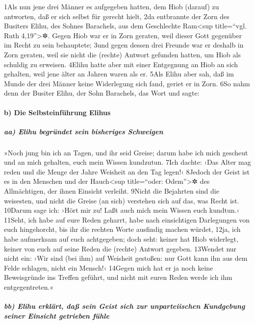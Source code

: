 1Als nun jene drei Männer es aufgegeben hatten, dem Hiob (darauf) zu
antworten, daß er sich selbst für gerecht hielt, 2da entbrannte der Zorn
des Busiters Elihu, des Sohnes Barachels, aus dem Geschlechte
Ram\textless sup title=``vgl. Ruth 4,19''\textgreater✲. Gegen Hiob war
er in Zorn geraten, weil dieser Gott gegenüber im Recht zu sein
behauptete; 3und gegen dessen drei Freunde war er deshalb in Zorn
geraten, weil sie nicht die (rechte) Antwort gefunden hatten, um Hiob
als schuldig zu erweisen. 4Elihu hatte aber mit einer Entgegnung an Hiob
an sich gehalten, weil jene älter an Jahren waren als er. 5Als Elihu
aber sah, daß im Munde der drei Männer keine Widerlegung sich fand,
geriet er in Zorn. 6So nahm denn der Busiter Elihu, der Sohn Barachels,
das Wort und sagte:

\hypertarget{b-die-selbsteinfuxfchrung-elihus}{%
\paragraph{b) Die Selbsteinführung
Elihus}\label{b-die-selbsteinfuxfchrung-elihus}}

\hypertarget{aa-elihu-begruxfcndet-sein-bisheriges-schweigen}{%
\subparagraph{aa) Elihu begründet sein bisheriges
Schweigen}\label{aa-elihu-begruxfcndet-sein-bisheriges-schweigen}}

»Noch jung bin ich an Tagen, und ihr seid Greise; darum habe ich mich
gescheut und an mich gehalten, euch mein Wissen kundzutun. 7Ich dachte:
›Das Alter mag reden und die Menge der Jahre Weisheit an den Tag legen!‹
8Jedoch der Geist ist es in den Menschen und der Hauch\textless sup
title=``oder: Odem''\textgreater✲ des Allmächtigen, der ihnen Einsicht
verleiht. 9Nicht die Bejahrten sind die weisesten, und nicht die Greise
(an sich) verstehen sich auf das, was Recht ist. 10Darum sage ich: ›Hört
mir zu! Laßt auch mich mein Wissen euch kundtun.‹ 11Seht, ich habe auf
eure Reden geharrt, habe nach einsichtigen Darlegungen von euch
hingehorcht, bis ihr die rechten Worte ausfindig machen würdet, 12ja,
ich habe aufmerksam auf euch achtgegeben; doch seht: keiner hat Hiob
widerlegt, keiner von euch auf seine Reden die (rechte) Antwort gegeben.
13Wendet nur nicht ein: ›Wir sind (bei ihm) auf Weisheit gestoßen: nur
Gott kann ihn aus dem Felde schlagen, nicht ein Mensch!‹ 14Gegen mich
hat er ja noch keine Beweisgründe ins Treffen geführt, und nicht mit
euren Reden werde ich ihm entgegentreten.«

\hypertarget{bb-elihu-erkluxe4rt-dauxdf-sein-geist-sich-zur-unparteiischen-kundgebung-seiner-einsicht-getrieben-fuxfchle}{%
\subparagraph{bb) Elihu erklärt, daß sein Geist sich zur unparteiischen
Kundgebung seiner Einsicht getrieben
fühle}\label{bb-elihu-erkluxe4rt-dauxdf-sein-geist-sich-zur-unparteiischen-kundgebung-seiner-einsicht-getrieben-fuxfchle}}

